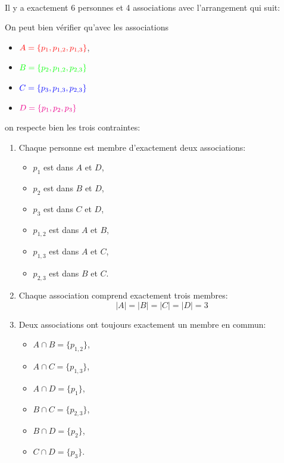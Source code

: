 \begin{td-sol}[]\,\\ %
    Il y a exactement 6 personnes et 4 associations avec l'arrangement qui suit:

    \vspace{0.5cm}
    

    On peut bien vérifier qu'avec les associations
    \begin{itemize}
        \item \(\color{red}A = \{p_1, p_{1,2}, p_{1,3}\}\),
        \item \(\color{green}B = \{p_2, p_{1,2}, p_{2,3}\}\)
        \item \(\color{blue}C = \{p_3, p_{1,3}, p_{2,3}\}\)
        \item \(\color{magenta}D = \{p_1, p_2, p_3\}\)
    \end{itemize}
    on respecte bien les trois contraintes:
    \begin{enumerate}
        \item Chaque personne est membre d'exactement deux associations:
        \begin{itemize}
            \item \(p_1\) est dans \(A\) et \(D\),
            \item \(p_2\) est dans \(B\) et \(D\),
            \item \(p_3\) est dans \(C\) et \(D\),
            \item \(p_{1,2}\) est dans \(A\) et \(B\),
            \item \(p_{1,3}\) est dans \(A\) et \(C\),
            \item \(p_{2,3}\) est dans \(B\) et \(C\).
        \end{itemize}
        \item Chaque association comprend exactement trois membres: 
        \begin{equation*}
            |A| = |B| = |C| = |D| = 3
        \end{equation*}
        \item Deux associations ont toujours exactement un membre en commun:
        \begin{itemize}
            \item \(A\cap B = \{p_{1,2}\}\),
            \item \(A\cap C = \{p_{1,3}\}\),
            \item \(A\cap D = \{p_1\}\),
            \item \(B\cap C = \{p_{2,3}\}\),
            \item \(B\cap D = \{p_2\}\),
            \item \(C\cap D = \{p_3\}\).
        \end{itemize}
    \end{enumerate}
\end{td-sol}


